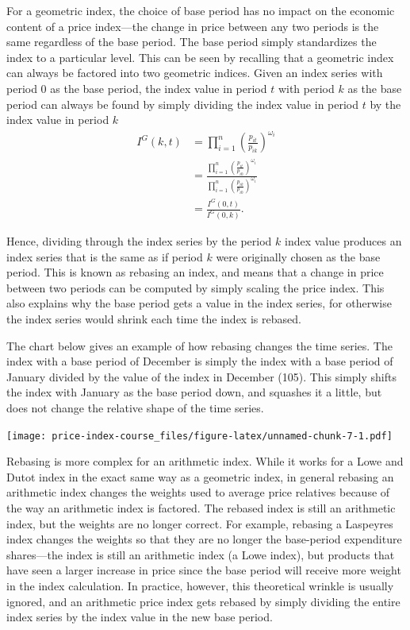 \documentclass[]{article}
\begin{document}
For a geometric index, the choice of base period has no impact on the economic content of a price index---the change in price between any two periods is the same regardless of the base period. The base period simply standardizes the index to a particular level. This can be seen by recalling that a geometric index can always be factored into two geometric indices. Given an index series with period 0 as the base period, the index value in period \(t\) with period \(k\) as the base period can always be found by simply dividing the index value in period \(t\) by the index value in period \(k\)
\begin{align*}
I^{G}(k, t) &= \prod_{i = 1}^{n} \left(\frac{p_{it}}{p_{ik}}\right)^{\omega_{i}} \\
&= \frac{\prod_{i = 1}^{n} \left(\frac{p_{it}}{p_{i0}}\right)^{\omega_{i}}}{\prod_{i = 1}^{n} \left(\frac{p_{ik}}{p_{i0}}\right)^{\omega_{i}}} \\
&= \frac{I^{G}(0, t)}{I^{G}(0, k)}.
\end{align*}

Hence, dividing through the index series by the period \(k\) index value produces an index series that is the same as if period \(k\) were originally chosen as the base period. This is known as rebasing an index, and means that a change in price between two periods can be computed by simply scaling the price index. This also explains why the base period gets a value in the index series, for otherwise the index series would shrink each time the index is rebased.

The chart below gives an example of how rebasing changes the time series. The index with a base period of December is simply the index with a base period of January divided by the value of the index in December (105). This simply shifts the index with January as the base period down, and squashes it a little, but does not change the relative shape of the time series.

\texttt{[image: price-index-course\_files/figure-latex/unnamed-chunk-7-1.pdf]}

Rebasing is more complex for an arithmetic index. While it works for a Lowe and Dutot index in the exact same way as a geometric index, in general rebasing an arithmetic index changes the weights used to average price relatives because of the way an arithmetic index is factored. The rebased index is still an arithmetic index, but the weights are no longer correct. For example, rebasing a Laspeyres index changes the weights so that they are no longer the base-period expenditure shares---the index is still an arithmetic index (a Lowe index), but products that have seen a larger increase in price since the base period will receive more weight in the index calculation. In practice, however, this theoretical wrinkle is usually ignored, and an arithmetic price index gets rebased by simply dividing the entire index series by the index value in the new base period.
\end{document}
